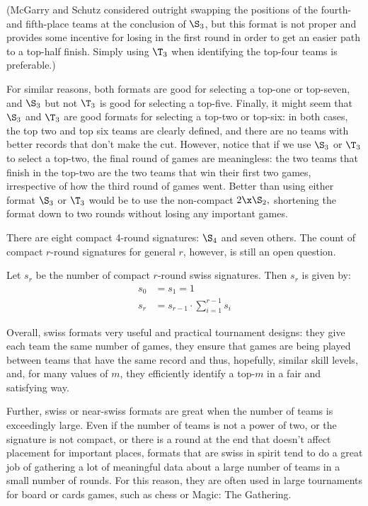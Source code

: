 {(McGarry and Schutz \cite{four_five_swap} considered outright swapping the positions of the fourth- and fifth-place teams at the conclusion of $\S_3$, but this format is not proper and provides some incentive for losing in the first round in order to get an easier path to a top-half finish. Simply using $\T_3$ when identifying the top-four teams is preferable.)

For similar reasons, both formats are good for selecting a top-one or top-seven, and $\S_3$ but not $\T_3$ is good for selecting a top-five. Finally, it might seem that $\S_3$ and $\T_3$ are good formats for selecting a top-two or top-six: in both cases, the top two and top six teams are clearly defined, and there are no teams with better records that don't make the cut. However, notice that if we use $\S_3$ or $\T_3$ to select a top-two, the final round of games are meaningless: the two teams that finish in the top-two are the two teams that win their first two games, irrespective of how the third round of games went. Better than using either format $\S_3$ or $\T_3$ would be to use the non-compact $2\x\S_2,$ shortening the format down to two rounds without losing any important games.

There are eight compact 4-round signatures: $\S_4$ and seven others. The count of compact $r$-round signatures for general $r$, however, is still an open question.


\begin{conj}{}{}
    Let $s_r$ be the number of compact $r$-round swiss signatures. Then $s_r$ is given by:
    \begin{align*}
        s_0 &= s_ 1 = 1\\
        s_r &= s_{r-1} \cdot \sum_{i=1}^{r-1}s_i
    \end{align*}
\end{conj}

Overall, swiss formats very useful and practical tournament designs: they give each team the same number of games, they ensure that games are being played between teams that have the same record and thus, hopefully, similar skill levels, and, for many values of $m$, they efficiently identify a top-$m$ in a fair and satisfying way.

Further, swiss or near-swiss formats are great when the number of teams is exceedingly large. Even if the number of teams is not a power of two, or the signature is not compact, or there is a round at the end that doesn't affect placement for important places, formats that are swiss in spirit tend to do a great job of gathering a lot of meaningful data about a large number of teams in a small number of rounds. For this reason, they are often used in large tournaments for board or cards games, such as chess or Magic: The Gathering.
}